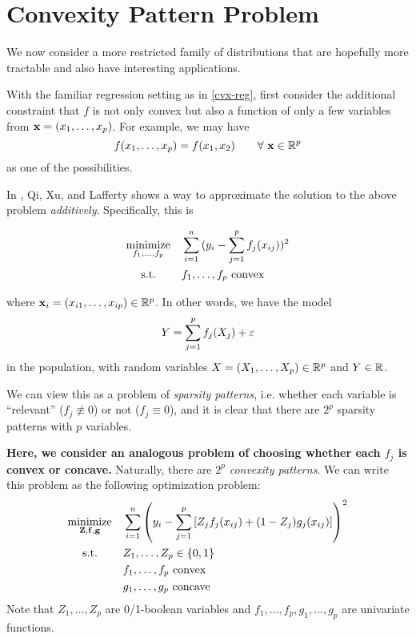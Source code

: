 \documentclass[11pt]{article}
\newcommand{\optprob}[5]
{
	\begin{equation}\label{#5}
	\begin{aligned}
	& \underset{#2}{\text{#1}}
	& & #3 \\
	& \text{\quad\ s.t.}
	& & #4
	\end{aligned}
	\end{equation}
}
\begin{document}
\clearpage
\section{Convexity Pattern Problem}

We now consider a more restricted family of distributions that are hopefully more tractable and also have interesting applications.

With the familiar regression setting as in \eqref{cvx-reg}, first consider the additional constraint that $f$ is not only convex but also a function of only a few variables from ${\bf x} = (x_1, \dotsc, x_p)$. For example, we may have
\[
f(x_1, \dotsc, x_p) = f(x_1, x_2) \qquad \forall\ {\bf x} \in {\mathbb R}^p
\]
as one of the possibilities. 

In \cite{DCM}, Qi, Xu, and Lafferty shows a way to approximate the solution to the above problem \emph{additively}. Specifically, this is 
\optprob{minimize}{f_1, \dotsc, f_p}{\sum_{i=1}^n{(y_i - \sum_{j=1}^p f_j(x_{ij}))^2}}{f_1, \dotsc, f_p \text{ convex}}{cvx-additive-reg}
where ${\bf x}_i = (x_{i1}, \dotsc, x_{ip}) \in {\mathbb R}^p$. In other words, we have the model
\[
Y = \sum_{j=1}^p f_j(X_j) + \varepsilon
\]
in the population, with random variables $X = (X_1, \dotsc, X_p) \in {\mathbb R}^p$ and $Y \in {\mathbb R}$.

We can view this as a problem of \emph{sparsity patterns}, i.e. whether each variable is ``relevant'' ($f_j \not\equiv 0$) or not ($f_j \equiv 0$), and it is clear that there are $2^p$ sparsity patterns with $p$ variables.

\textbf{Here, we consider an analogous problem of choosing whether each $f_j$ is convex or concave.} Naturally, there are $2^p$ \emph{convexity patterns}. We can write this problem as the following optimization problem:
\begin{equation}\label{cvx-pattern}
\begin{aligned}
& \underset{{\bf Z}, {\bf f}, {\bf g}}{\text{minimize}}
& & \sum_{i=1}^n \left(y_i - \sum_{j=1}^p\left[Z_jf_j(x_{ij}) + (1-Z_j)g_j(x_{ij})\right]\right)^2 \\
& \text{\quad\ s.t.}
& & Z_1, \dotsc, Z_p \in \{0,1\} \\
& & & f_1, \dotsc, f_p \text{ convex} \\
& & & g_1, \dotsc, g_p \text{ concave} 
\end{aligned}
\end{equation}
Note that $Z_1, \dotsc, Z_p$ are 0/1-boolean variables and $f_1, \dotsc, f_p, g_1, \dotsc, g_p$ are univariate functions.
\end{document}

